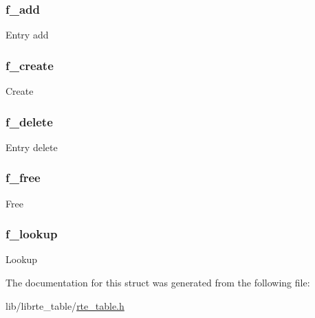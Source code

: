 \subsubsection[{f\+\_\+add}]{ f\+\_\+add}\label{structrte__table__ops_a6bc8d96534542847a93a467448278380}
Entry add \hypertarget{structrte__table__ops_a582953d3e215188ebc56a5d8e31b8979}{}
\subsubsection[{f\+\_\+create}]{ f\+\_\+create}\label{structrte__table__ops_a582953d3e215188ebc56a5d8e31b8979}
Create \hypertarget{structrte__table__ops_a3409b4198a8d76aaa2c839855e39ea71}{}
\subsubsection[{f\+\_\+delete}]{ f\+\_\+delete}\label{structrte__table__ops_a3409b4198a8d76aaa2c839855e39ea71}
Entry delete \hypertarget{structrte__table__ops_a19eeac6f1dcc70175d34134a189b1ff6}{}
\subsubsection[{f\+\_\+free}]{ f\+\_\+free}\label{structrte__table__ops_a19eeac6f1dcc70175d34134a189b1ff6}
Free \hypertarget{structrte__table__ops_a36c72b180da058faec39cd6dc89dd7e9}{}
\subsubsection[{f\+\_\+lookup}]{ f\+\_\+lookup}\label{structrte__table__ops_a36c72b180da058faec39cd6dc89dd7e9}
Lookup 

The documentation for this struct was generated from the following file\+:\begin{DoxyCompactItemize}
\item 
lib/librte\+\_\+table/\hyperlink{rte__table_8h}{rte\+\_\+table.\+h}\end{DoxyCompactItemize}
